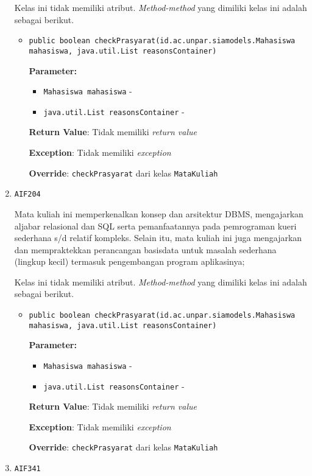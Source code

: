 \documentclass{article}
\begin{document}
\begin{enumerate}
Kelas ini tidak memiliki atribut. \textit{Method-method} yang dimiliki kelas ini adalah sebagai berikut.
\begin{itemize}
\item \texttt{public boolean checkPrasyarat(id.ac.unpar.siamodels.Mahasiswa mahasiswa, java.util.List reasonsContainer)}

\textbf{Parameter:}
\begin{itemize}
\item \texttt{Mahasiswa mahasiswa} - 
\item \texttt{java.util.List reasonsContainer} - 
\end{itemize}
\textbf{Return Value}: Tidak memiliki \textit{return value}

\textbf{Exception}: Tidak memiliki \textit{exception}

\textbf{Override}: \texttt{checkPrasyarat} dari kelas \texttt{MataKuliah}

\end{itemize}
\item \texttt{AIF204}

Mata kuliah ini memperkenalkan konsep dan arsitektur DBMS, mengajarkan 
 aljabar relasional dan SQL serta pemanfaatannya pada pemrograman kueri 
 sederhana s/d relatif kompleks. Selain itu, mata kuliah ini juga mengajarkan 
 dan mempraktekkan perancangan basisdata untuk masalah sederhana 
 (lingkup kecil) termasuk pengembangan program aplikasinya;

Kelas ini tidak memiliki atribut. \textit{Method-method} yang dimiliki kelas ini adalah sebagai berikut.
\begin{itemize}
\item \texttt{public boolean checkPrasyarat(id.ac.unpar.siamodels.Mahasiswa mahasiswa, java.util.List reasonsContainer)}

\textbf{Parameter:}
\begin{itemize}
\item \texttt{Mahasiswa mahasiswa} - 
\item \texttt{java.util.List reasonsContainer} - 
\end{itemize}
\textbf{Return Value}: Tidak memiliki \textit{return value}

\textbf{Exception}: Tidak memiliki \textit{exception}

\textbf{Override}: \texttt{checkPrasyarat} dari kelas \texttt{MataKuliah}

\end{itemize}
\item \texttt{AIF341}


\end{enumerate}
\end{document}
